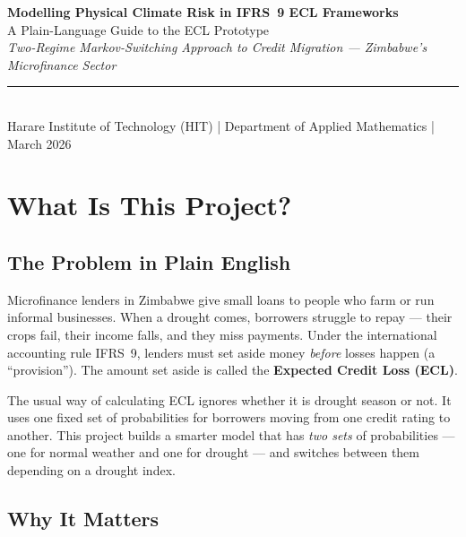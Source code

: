 \documentclass[12pt,a4paper]{article}
\begin{document}
\begin{center}
  {\LARGE\bfseries\color{hitblue}
    Modelling Physical Climate Risk in IFRS~9 ECL Frameworks}\\[6pt]
  {\large A Plain-Language Guide to the ECL Prototype}\\[4pt]
  {\normalsize\itshape
    Two-Regime Markov-Switching Approach to Credit Migration ---
    Zimbabwe's Microfinance Sector}\\[10pt]
  \rule{\linewidth}{0.8pt}\\[4pt]
  {\small
    Harare Institute of Technology (HIT) \quad|\quad
    Department of Applied Mathematics \quad|\quad
    March 2026}
\end{center}

\tableofcontents
\newpage

\section{What Is This Project?}

\subsection{The Problem in Plain English}

Microfinance lenders in Zimbabwe give small loans to people who farm or run
informal businesses.  When a drought comes, borrowers struggle to repay ---
their crops fail, their income falls, and they miss payments.  Under the
international accounting rule IFRS~9, lenders must set aside money
\emph{before} losses happen (a ``provision'').  The amount set aside is called
the \textbf{Expected Credit Loss (ECL)}.

The usual way of calculating ECL ignores whether it is drought season or not.
It uses one fixed set of probabilities for borrowers moving from one credit
rating to another.  This project builds a smarter model that has \emph{two
sets} of probabilities --- one for normal weather and one for drought --- and
switches between them depending on a drought index.

\subsection{Why It Matters}
\end{document}
